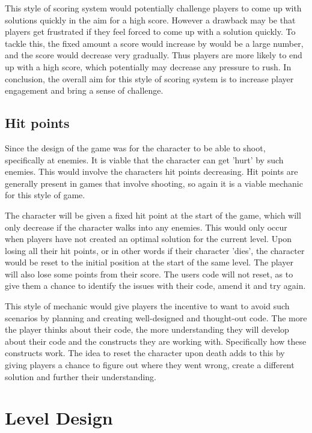 \documentclass[a4paper,11.5pt]{report}
\numberwithin{figure}{section}
\numberwithin{table}{section}
\numberwithin{equation}{section}
\numberwithin{equation}{section}
\begin{document}
This style of scoring system would potentially challenge players to come up with solutions quickly in the aim for a high score. However a drawback may be that players get frustrated if they feel forced to come up with a solution quickly. To tackle this, the fixed amount a score would increase by would be a large number, and the score would decrease very gradually. Thus players are more likely to end up with a high score, which potentially may decrease any pressure to rush. In conclusion, the overall aim for this style of scoring system is to increase player engagement and bring a sense of challenge.

\subsection{Hit points}

Since the design of the game was for the character to be able to shoot, specifically at enemies. It is viable that the character can get 'hurt' by such enemies. This would involve the characters hit points decreasing. Hit points are generally present in games that involve shooting, so again it is a viable mechanic for this style of game. 

The character will be given a fixed hit point at the start of the game, which will only decrease if the character walks into any enemies. This would only occur when players have not created an optimal solution for the current level. Upon losing all their hit points, or in other words if their character 'dies', the character would be reset to the initial position at the start of the same level. The player will also lose some points from their score. The users code will not reset, as to give them a chance to identify the issues with their code, amend it and try again.

This style of mechanic would give players the incentive to want to avoid such scenarios by planning and creating well-designed and thought-out code. The more the player thinks about their code, the more understanding they will develop about their code and the constructs they are working with. Specifically how these constructs work. The idea to reset the character upon death adds to this by giving players a chance to figure out where they went wrong, create a different solution and further their understanding.

\section{Level Design} %
\end{document}
